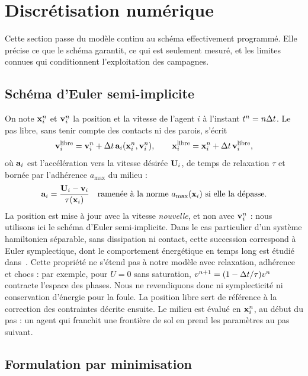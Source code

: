 \section{Discrétisation numérique}
\label{sec:discretisation}

Cette section passe du modèle continu au schéma effectivement programmé. Elle
précise ce que le schéma garantit, ce qui est seulement mesuré, et les limites
connues qui conditionnent l'exploitation des campagnes.

\subsection{Schéma d'Euler semi-implicite}

On note $\mathbf{x}^n_i$ et $\mathbf{v}^n_i$ la position et la vitesse de l'agent $i$ à
l'instant $t^n=n\Delta t$. Le pas libre, sans tenir compte des contacts ni des parois,
s'écrit
\begin{equation}
\label{eq:pas-libre}
\mathbf{v}^{\mathrm{libre}}_i = \mathbf{v}^n_i + \Delta t\,\mathbf{a}_i(\mathbf{x}^n_i,\mathbf{v}^n_i),
\qquad
\mathbf{x}^{\mathrm{libre}}_i = \mathbf{x}^n_i + \Delta t\,\mathbf{v}^{\mathrm{libre}}_i ,
\end{equation}
où $\mathbf{a}_i$ est l'accélération vers la vitesse désirée $\mathbf{U}_i$, de
temps de relaxation $\tau$ et bornée par l'adhérence $a_{\max}$ du milieu :
\[
\mathbf{a}_i=\frac{\mathbf{U}_i-\mathbf{v}_i}{\tau(\mathbf{x}_i)}
\quad\text{ramenée à la norme } a_{\max}(\mathbf{x}_i) \text{ si elle la dépasse.}
\]
La position est mise à jour avec la vitesse \emph{nouvelle}, et non avec
$\mathbf{v}^n_i$ : nous utilisons ici le schéma d'Euler semi-implicite.
Dans le cas particulier d'un système hamiltonien séparable, sans dissipation
ni contact, cette succession correspond à Euler symplectique, dont le comportement
énergétique en temps long est étudié dans~\cite{hairer2006}. Cette propriété ne
s'étend pas à notre modèle avec relaxation, adhérence et chocs : par exemple,
pour $U=0$ sans saturation, $v^{n+1}=(1-\Delta t/\tau)v^n$ contracte l'espace des phases.
Nous ne revendiquons donc ni symplecticité ni conservation d'énergie pour la foule.
La position libre sert de référence à la correction des contraintes décrite ensuite.
Le milieu est évalué en $\mathbf{x}^n_i$, au début du pas :
un agent qui franchit une frontière de sol en prend les paramètres au pas suivant.

\subsection{Formulation par minimisation}

